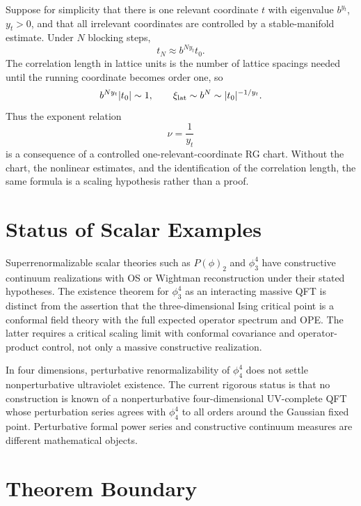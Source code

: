 Suppose for simplicity that there is one relevant coordinate \(t\) with
eigenvalue \(b^{y_t}\), \(y_t>0\), and that all irrelevant coordinates are
controlled by a stable-manifold estimate.  Under \(N\) blocking steps,
\[
  t_N\approx b^{Ny_t}t_0.
\]
The correlation length in lattice units is the number of lattice spacings
needed until the running coordinate becomes order one, so
\[
  b^{Ny_t}|t_0|\sim1,
  \qquad
  \xi_{\rm lat}\sim b^N\sim |t_0|^{-1/y_t}.
\]
Thus the exponent relation
\begin{equation}
  \nu=\frac1{y_t}
  \label{eq:continuum-limit-nu-yt-relation}
\end{equation}
is a consequence of a controlled one-relevant-coordinate RG chart.  Without
the chart, the nonlinear estimates, and the identification of the
correlation length, the same formula is a scaling hypothesis rather than a
proof.

\section{Status of Scalar Examples}

Superrenormalizable scalar theories such as \(P(\phi)_2\) and
\(\phi^4_3\) have constructive continuum realizations with OS or Wightman
reconstruction under their stated hypotheses.  The existence theorem for
\(\phi^4_3\) as an interacting massive QFT is distinct from the assertion
that the three-dimensional Ising critical point is a conformal field theory
with the full expected operator spectrum and OPE.  The latter requires a
critical scaling limit with conformal covariance and operator-product
control, not only a massive constructive realization.

In four dimensions, perturbative renormalizability of \(\phi^4_4\) does not
settle nonperturbative ultraviolet existence.  The current rigorous status is
that no construction is known of a nonperturbative four-dimensional
UV-complete QFT whose perturbation series agrees with \(\phi^4_4\) to all
orders around the Gaussian fixed point.  Perturbative formal power series and
constructive continuum measures are different mathematical objects.

\section{Theorem Boundary}

